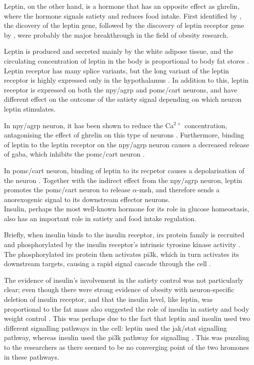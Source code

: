 \noindent
Leptin, on the other hand, is a hormone that has an opposite effect as ghrelin, where the hormone signals satiety and reduces food intake.
First identified by \citet{Zhang1994}, the dicovery of the leptin gene, followed by the discovery of leptin receptor gene by \citet{Tartaglia1995}, were probably the major breakthrough in the field of obesity research.

Leptin is produced and secreted mainly by the white adipose tissue, and the circulating concentration of leptin in the body is proportional to body fat stores \citep{Barsh2002, Moustafa2013, Zhang1994}.
Leptin receptor has many splice variants, but the long variant of the leptin receptor is highly expressed only in the hypothalamus \citep{Ghilardi1996, Lee1996}.
In addition to this, leptin receptor is expressed on both the \gls{npy}/\gls{agrp} and \gls{pomc}/\gls{cart} neurons, and have different effect on the outcome of the satiety signal depending on which neuron leptin stimulates.

In \gls{npy}/\gls{agrp} neuron, it has been shown to reduce the Ca$^{2+}$ concentration, antagonising the effect of ghrelin on this type of neurons \citep{Kohno2003}.
Furthermore, binding of leptin to the leptin receptor on the \gls{npy}/\gls{agrp} neuron causes a decreased release of \gls{gaba}, which inhibits the \gls{pomc}/\gls{cart} neuron \citep{Cowley2001}.

In \gls{pomc}/\gls{cart} neuron, binding of leptin to its recpetor causes a depolarisation of the neuron \citep{Cowley2001}.
Together with the indirect effect from the \gls{npy}/\gls{agrp} neuron, leptin promotes the \gls{pomc}/\gls{cart} neuron to release $\alpha$-\gls{msh}, and therefore sends a anorexogenic signal to its downstream effector neurons.
\\

\noindent
Insulin, perhaps the most well-known hormone for its role in glucose homeostasis, also has an important role in satiety and food intake regulation.

Briefly, when insulin binds to the insulin receptor, \gls{irs} protein family is recruited and phosphorylated by the insulin receptor's intrinsic tyrosine kinase activity \citep{Saltiel2002}.
The phosphorylated \gls{irs} protein then activates \gls{pi3k}, which in turn activates its downstream targets, causing a rapid signal cascade through the cell \citep{Saltiel2002}.

The evidence of insulin's involvement in the satiety control was not particularly clear; even though there were strong evidence of obesity with neuron-specific deletion of insulin receptor, and that the insulin level, like leptin, was proportional to the fat mass also suggested the role of insulin in satiety and body weight control \citep{Barsh2002, Bruning2000, Woods1979}.
This was perhaps due to the fact that leptin and insulin used two different signalling pathways in the cell: leptin used the \gls{jak}/\gls{stat} signalling pathway, whereas insulin used the \gls{pi3k} pathway for signalling \citep{Ghilardi1996}.
This was puzzling to the researchers as there seemed to be no converging point of the two hromones in these pathways.

